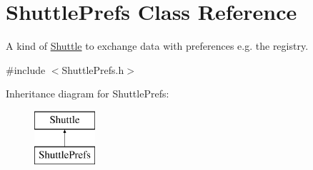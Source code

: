 \hypertarget{class_shuttle_prefs}{}\section{Shuttle\+Prefs Class Reference}
\label{class_shuttle_prefs}


A kind of \hyperlink{class_shuttle}{Shuttle} to exchange data with preferences e.\+g. the registry.  




{\ttfamily \#include $<$Shuttle\+Prefs.\+h$>$}

Inheritance diagram for Shuttle\+Prefs\+:\begin{figure}[H]
\begin{center}
\leavevmode
\includegraphics[height=2.000000cm]{class_shuttle_prefs}
\end{center}
\end{figure}
